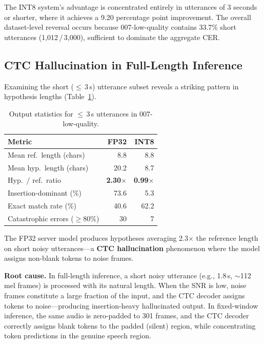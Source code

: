 \documentclass[a4paper,11pt,twocolumn]{article}
\begin{document}
The INT8 system's advantage is concentrated entirely in utterances of 3 seconds or shorter, where it achieves a 9.20 percentage point improvement. The overall dataset-level reversal occurs because 007-low-quality contains 33.7\% short utterances (1,012\,/\,3,000), sufficient to dominate the aggregate CER.

\subsection{CTC Hallucination in Full-Length Inference}

Examining the short ($\leq$\,3\,s) utterance subset reveals a striking pattern in hypothesis lengths (Table~\ref{tab:hallucination}).

\begin{table}[t]
\centering
\caption{Output statistics for $\leq$\,3\,s utterances in 007-low-quality.}
\label{tab:hallucination}
\small
\begin{tabular}{@{}lrr@{}}
\toprule
Metric & FP32 & INT8 \\
\midrule
Mean ref.\ length (chars) & 8.8 & 8.8 \\
Mean hyp.\ length (chars) & 20.2 & 8.7 \\
Hyp.\ / ref.\ ratio & \textbf{2.30$\times$} & \textbf{0.99$\times$} \\
Insertion-dominant (\%) & 73.6 & 5.3 \\
Exact match rate (\%) & 40.6 & 62.2 \\
Catastrophic errors ($\geq$80\%) & 30 & 7 \\
\bottomrule
\end{tabular}
\end{table}

The FP32 server model produces hypotheses averaging 2.3$\times$ the reference length on short noisy utterances---a \textbf{CTC hallucination} phenomenon where the model assigns non-blank tokens to noise frames.

\textbf{Root cause.} In full-length inference, a short noisy utterance (e.g., 1.8\,s, ${\sim}$112 mel frames) is processed with its natural length. When the SNR is low, noise frames constitute a large fraction of the input, and the CTC decoder assigns tokens to noise---producing insertion-heavy hallucinated output. In fixed-window inference, the same audio is zero-padded to 301 frames, and the CTC decoder correctly assigns blank tokens to the padded (silent) region, while concentrating token predictions in the genuine speech region.
\end{document}
